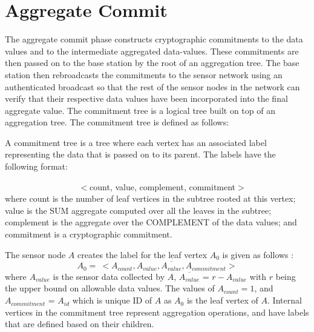 \section{Aggregate Commit} 
	\label{sub:aggregate_commit}
	The aggregate commit phase constructs cryptographic commitments to the data values and to the intermediate aggregated data-values.
	These commitments are then passed on to the base station by the root of an aggregation tree.
	The base station then rebroadcasts the commitments to the sensor network using an authenticated broadcast so that the rest of the sensor nodes in the network can verify that their respective data values have been incorporated into the final aggregate value.
	The commitment tree is a logical tree built on top of an aggregation tree.
	The commitment tree is defined as follows:
	\begin{definition}
		\cite{chan2006secure}
		A commitment tree is a tree where each vertex has an associated label representing the data that is passed on to its parent. The labels have the following format:

		$\hspace{100pt}$ $<$count, value, complement, commitment$>$\\
		where count is the number of leaf vertices in the subtree rooted at this vertex; value is the SUM aggregate computed over all the leaves in the subtree; complement is the aggregate over the COMPLEMENT of the data values; and commitment is a cryptographic commitment.
		\label{def:label}
	\end{definition}
	The sensor node $A$ creates the label for the leaf vertex $A_{0}$ is given as follows :
	\begin{equation}
		A_{0} =\ <A_{count}, A_{value}, \overline{A_{value}}, A_{commitment}>
	\end{equation}
	where $A_{value}$ is the sensor data collected by $A$, $\overline{A_{value}}$ = $r - A_{value}$ with $r$ being the upper bound on allowable data values.
	The values of $A_{count} = 1$, and $A_{commitment}$ = $A_{id}$ which is unique ID of $A$ as $A_{0}$ is the leaf vertex of $A$.
	Internal vertices in the commitment tree represent aggregation operations, and have labels that are defined based on their children. 
